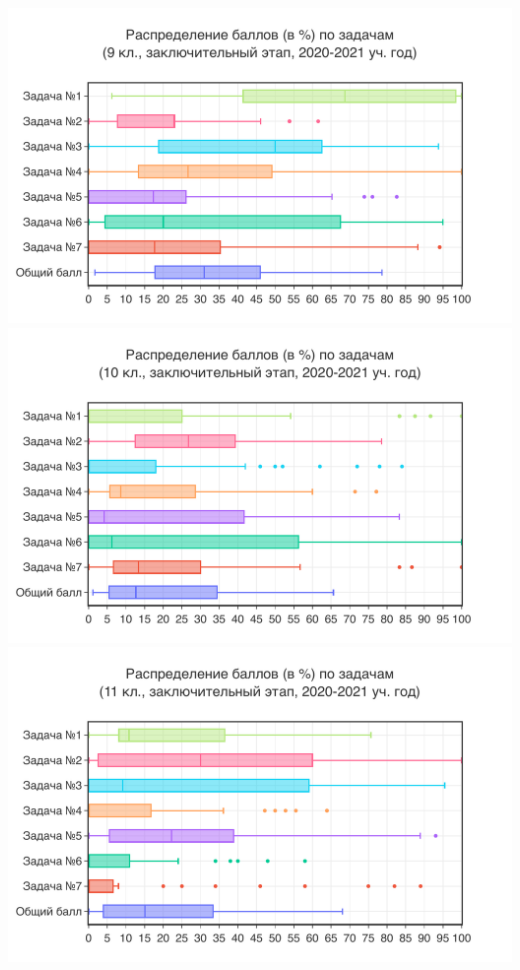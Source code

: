 \includegraphics[width=\linewidth]{../export/pdf/results/2021/respa/grade9-dist-box.pdf}
\includegraphics[width=\linewidth]{../export/pdf/results/2021/respa/grade10-dist-box.pdf}
\includegraphics[width=\linewidth]{../export/pdf/results/2021/respa/grade11-dist-box.pdf}

